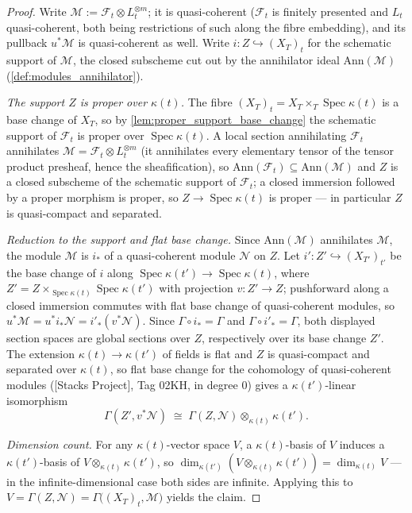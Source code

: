 \begin{proof}
  Write \(\mathcal{M} := \mathcal{F}_t \otimes L_t^{\otimes m}\); it is
  quasi-coherent (\(\mathcal{F}_t\) is finitely presented and \(L_t\)
  quasi-coherent, both being restrictions of such along the fibre
  embedding), and its pullback \(u^*\mathcal{M}\) is quasi-coherent as well.
  Write \(i : Z \hookrightarrow (X_T)_t\) for the schematic support of
  \(\mathcal{M}\), the closed subscheme cut out by the annihilator ideal
  \(\mathrm{Ann}(\mathcal{M})\) (\cref{def:modules_annihilator}).

  \emph{The support \(Z\) is proper over \(\kappa(t)\).}  The fibre
  \((X_T)_t = X_T \times_T \operatorname{Spec} \kappa(t)\) is a base change
  of \(X_T\), so by \cref{lem:proper_support_base_change} the schematic
  support of \(\mathcal{F}_t\) is proper over
  \(\operatorname{Spec} \kappa(t)\).  A local section annihilating
  \(\mathcal{F}_t\) annihilates \(\mathcal{M} = \mathcal{F}_t \otimes
  L_t^{\otimes m}\) (it annihilates every elementary tensor of the tensor
  product presheaf, hence the sheafification), so
  \(\mathrm{Ann}(\mathcal{F}_t) \subseteq \mathrm{Ann}(\mathcal{M})\) and
  \(Z\) is a closed subscheme of the schematic support of
  \(\mathcal{F}_t\); a closed immersion followed by a proper morphism is
  proper, so \(Z \to \operatorname{Spec} \kappa(t)\) is proper — in
  particular \(Z\) is quasi-compact and separated.

  \emph{Reduction to the support and flat base change.}  Since
  \(\mathrm{Ann}(\mathcal{M})\) annihilates \(\mathcal{M}\), the module
  \(\mathcal{M}\) is \(i_*\) of a quasi-coherent module \(\mathcal{N}\) on
  \(Z\).  Let \(i' : Z' \hookrightarrow (X_{T'})_{t'}\) be the base change of
  \(i\) along \(\operatorname{Spec} \kappa(t') \to
  \operatorname{Spec} \kappa(t)\), where
  \(Z' = Z \times_{\operatorname{Spec} \kappa(t)}
  \operatorname{Spec} \kappa(t')\) with projection \(v : Z' \to Z\);
  pushforward along a closed immersion commutes with flat base change of
  quasi-coherent modules, so \(u^*\mathcal{M} = u^* i_* \mathcal{N} =
  i'_* (v^* \mathcal{N})\).  Since \(\Gamma \circ i_* = \Gamma\) and
  \(\Gamma \circ i'_* = \Gamma\), both displayed section spaces are global
  sections over \(Z\), respectively over its base change \(Z'\).  The
  extension \(\kappa(t) \to \kappa(t')\) of fields is flat and \(Z\) is
  quasi-compact and separated over \(\kappa(t)\), so flat base change for
  the cohomology of quasi-coherent modules ([Stacks Project], Tag 02KH, in
  degree \(0\)) gives a \(\kappa(t')\)-linear isomorphism
  \[
    \Gamma(Z', v^*\mathcal{N})
    \;\cong\;
    \Gamma(Z, \mathcal{N}) \otimes_{\kappa(t)} \kappa(t').
  \]

  \emph{Dimension count.}  For any \(\kappa(t)\)-vector space \(V\), a
  \(\kappa(t)\)-basis of \(V\) induces a \(\kappa(t')\)-basis of
  \(V \otimes_{\kappa(t)} \kappa(t')\), so
  \(\dim_{\kappa(t')}(V \otimes_{\kappa(t)} \kappa(t')) =
  \dim_{\kappa(t)} V\) — in the infinite-dimensional case both sides are
  infinite.  Applying this to \(V = \Gamma(Z, \mathcal{N}) =
  \Gamma\bigl((X_T)_t, \mathcal{M}\bigr)\) yields the claim.
\end{proof}

